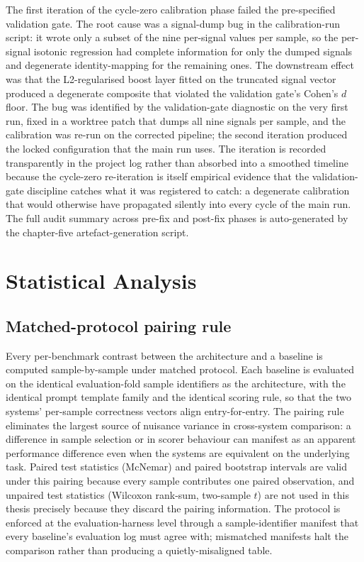 The first iteration of the cycle-zero calibration phase failed the pre-specified validation gate. The root cause was a signal-dump bug in the calibration-run script: it wrote only a subset of the nine per-signal values per sample, so the per-signal isotonic regression had complete information for only the dumped signals and degenerate identity-mapping for the remaining ones. The downstream effect was that the L2-regularised boost layer fitted on the truncated signal vector produced a degenerate composite that violated the validation gate's Cohen's $d$ floor. The bug was identified by the validation-gate diagnostic on the very first run, fixed in a worktree patch that dumps all nine signals per sample, and the calibration was re-run on the corrected pipeline; the second iteration produced the locked configuration that the main run uses. The iteration is recorded transparently in the project log rather than absorbed into a smoothed timeline because the cycle-zero re-iteration is itself empirical evidence that the validation-gate discipline catches what it was registered to catch: a degenerate calibration that would otherwise have propagated silently into every cycle of the main run. The full audit summary across pre-fix and post-fix phases is auto-generated by the chapter-five artefact-generation script.


\section{Statistical Analysis}
\label{sec:significance}

\subsection{Matched-protocol pairing rule}
\label{sec:sig-pairing}

Every per-benchmark contrast between the architecture and a baseline is computed sample-by-sample under matched protocol. Each baseline is evaluated on the identical evaluation-fold sample identifiers as the architecture, with the identical prompt template family and the identical scoring rule, so that the two systems' per-sample correctness vectors align entry-for-entry. The pairing rule eliminates the largest source of nuisance variance in cross-system comparison: a difference in sample selection or in scorer behaviour can manifest as an apparent performance difference even when the systems are equivalent on the underlying task. Paired test statistics (McNemar) and paired bootstrap intervals are valid under this pairing because every sample contributes one paired observation, and unpaired test statistics (Wilcoxon rank-sum, two-sample $t$) are not used in this thesis precisely because they discard the pairing information. The protocol is enforced at the evaluation-harness level through a sample-identifier manifest that every baseline's evaluation log must agree with; mismatched manifests halt the comparison rather than producing a quietly-misaligned table.

